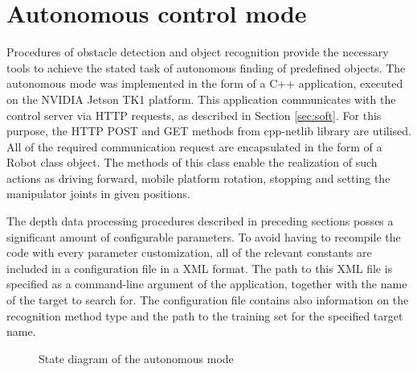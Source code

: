 
\section{Autonomous control mode}
\label{sec:autonomy}

Procedures of obstacle detection and object recognition provide the necessary tools to achieve the stated task of autonomous finding of predefined objects. The autonomous mode was implemented in the form of a C++ application, executed on the NVIDIA Jetson TK1 platform. This application communicates with the control server via HTTP requests, as described in Section \ref{sec:soft}. For this purpose, the HTTP POST and GET methods from cpp-netlib \cite{netlib} library are utilised. All of the required communication request are encapsulated in the form of a Robot class object. The methods of this class enable the realization of such actions as driving forward, mobile platform rotation, stopping and setting the manipulator joints in given positions. 

The depth data processing procedures described in preceding sections posses a significant amount of configurable parameters. To avoid having to recompile the code with every parameter customization, all of the relevant constants are included in a configuration file in a XML format. The path to this XML file is specified as a command-line argument of the application, together with the name of  the target to search for. The configuration file contains also information on the recognition method type and the path to the training set for the specified target name.

\begin{figure}[H]
\begin{centering}


\caption{State diagram of the autonomous mode}
\label{fig:statetrans}

\end{centering}
\end{figure}

